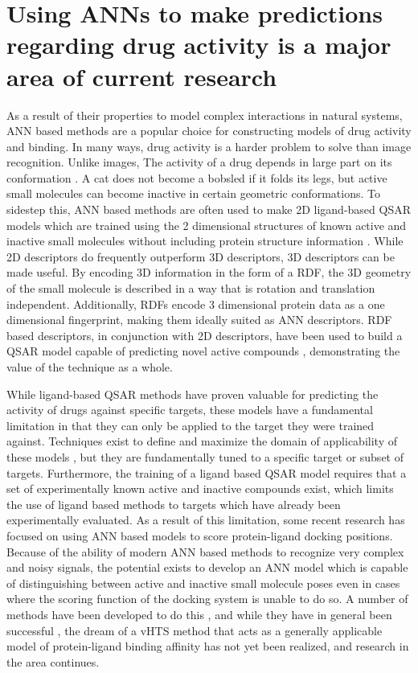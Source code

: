 \section{Using \acs{ANN}s to make predictions regarding drug activity is a major area of current research}

As a result of their properties to model complex interactions in natural systems, \ac{ANN} based methods are a popular choice for constructing models of drug activity and binding. 
In many ways, drug activity is a harder problem to solve than image recognition.
Unlike images, The activity of a drug depends in large part on its conformation \citep{Nicklaus:1995tu}.
A cat does not become a bobsled if it folds its legs, but active small molecules can become inactive in certain geometric conformations.
To sidestep this, \ac{ANN} based methods are often used to make 2D ligand-based \ac{QSAR} models which are trained using the 2 dimensional structures of known active and inactive small molecules without including protein structure information \citep{Myint:2012ts}.
While 2D descriptors do frequently outperform 3D descriptors, 3D descriptors can be made useful.
By encoding 3D information in the form of a \ac{RDF}, the 3D geometry of the small molecule is described in a way that is rotation and translation independent.
Additionally, \ac{RDF}s encode 3 dimensional protein data as a one dimensional fingerprint, making them ideally suited as \ac{ANN} descriptors.
\ac{RDF} based descriptors, in conjunction with 2D descriptors, have been used to build a \ac{QSAR} model capable of predicting novel active compounds \citep{Mueller:2010dx}, demonstrating the value of the technique as a whole.

While ligand-based \ac{QSAR} methods have proven valuable for predicting the activity of drugs against specific targets, these models have a fundamental limitation in that they can only be applied to the target they were trained against.
Techniques exist to define and maximize the domain of applicability of these models \citep{Sahigara:2012kb}, but they are fundamentally tuned to a specific target or subset of targets. 
Furthermore, the training of a ligand based \ac{QSAR} model requires that a set of experimentally known active and inactive compounds exist, which limits the use of ligand based methods to targets which have already been experimentally evaluated.
As a result of this limitation, some recent research has focused on using \ac{ANN} based models to score protein-ligand docking positions.
Because of the ability of modern \ac{ANN} based methods to recognize very complex and noisy signals, the potential exists to develop an \ac{ANN} model which is capable of distinguishing between active and inactive small molecule poses even in cases where the scoring function of the docking system is unable to do so. 
A number of methods have been developed to do this \citep{Durrant:2013db}, and while they have in general been successful \citep{Durrant:2011dx}, the dream of a \ac{vHTS} method that acts as a generally applicable model of protein-ligand binding affinity has not yet been realized, and research in the area continues. 


